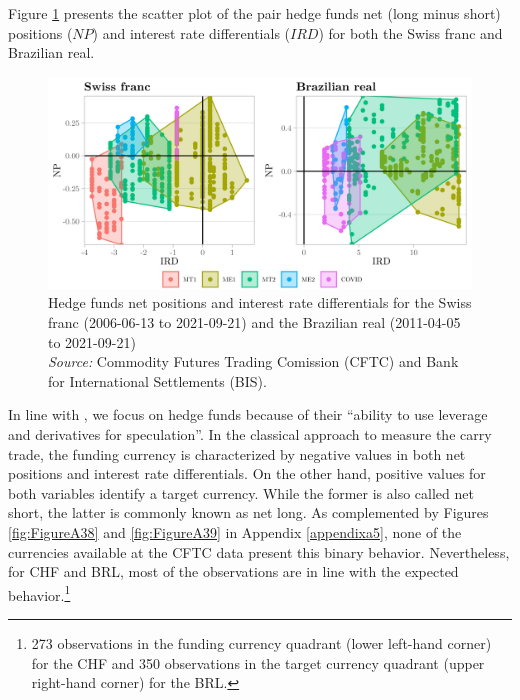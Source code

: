 \documentclass[a4paper, twoside]{templates/ociamthesis}
\begin{document}
Figure \ref{fig:Figure312} presents the scatter plot of the pair hedge funds net (long minus short) positions (\(NP\)) and interest rate differentials (\(IRD\)) for both the Swiss franc and Brazilian real.

\begin{figure}[!ht]

{\centering \includegraphics[width=0.99\columnwidth]{figure/CHFBRL_HF} 

}

\caption[Hedge funds net positions and interest rate differentials for the Swiss franc (2006-06-13 to 2021-09-21) and the Brazilian real (2011-04-05 to 2021-09-21)]{Hedge funds net positions and interest rate differentials for the Swiss franc (2006-06-13 to 2021-09-21) and the Brazilian real (2011-04-05 to 2021-09-21) \\ \scriptsize \textit{Source:} Commodity Futures Trading Comission (CFTC) and Bank for International Settlements (BIS).}\label{fig:Figure312}
\end{figure}

In line with \textcite[ 43]{fong2013}, we focus on hedge funds because of their ``ability to use leverage and derivatives for speculation''. In the classical approach to measure the carry trade, the funding currency is characterized by negative values in both net positions and interest rate differentials. On the other hand, positive values for both variables identify a target currency. While the former is also called net short, the latter is commonly known as net long. As complemented by Figures \ref{fig:FigureA38} and \ref{fig:FigureA39} in Appendix \ref{appendixa5}, none of the currencies available at the CFTC data present this binary behavior. Nevertheless, for CHF and BRL, most of the observations are in line with the expected behavior.\footnote{273 observations in the funding currency quadrant (lower left-hand corner) for the CHF and 350 observations in the target currency quadrant (upper right-hand corner) for the BRL.}
\end{document}
